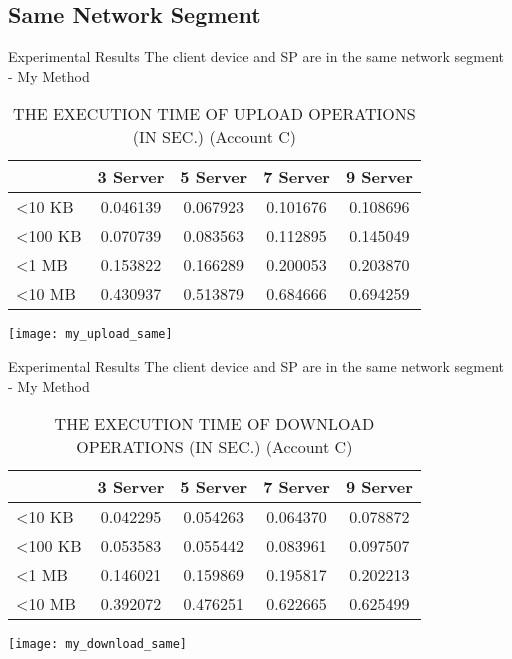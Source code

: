 \subsection{Same Network Segment}
\begin{frame}{Experimental Results}
{The client device and SP are in the same network segment - My Method}
	\scriptsize
    \begin{table}[]
    \centering
    \caption{THE EXECUTION TIME OF \alert{UPLOAD} OPERATIONS (IN SEC.) (Account C)}
    \begin{tabular}{lcccc}
                         & 3 Server & 5 Server & 7 Server & 9 Server \\ \hline
        \textless 10 KB  & 0.046139 & 0.067923 & 0.101676 & 0.108696 \\ \hline
        \textless 100 KB & 0.070739 & 0.083563 & 0.112895 & 0.145049 \\ \hline
        \textless 1 MB   & 0.153822 & 0.166289 & 0.200053 & 0.203870 \\ \hline
        \textless 10 MB  & 0.430937 & 0.513879 & 0.684666 & 0.694259 \\ \hline
    \end{tabular}
    \end{table}
    \begin{center}
		\texttt{[image: my\_upload\_same]}
    \end{center}
\end{frame}

\begin{frame}{Experimental Results}
{The client device and SP are in the same network segment - My Method}
	\scriptsize
    \begin{table}[]
    \centering
    \caption{THE EXECUTION TIME OF \alert{DOWNLOAD} OPERATIONS (IN SEC.) (Account C)}
    \begin{tabular}{lcccc}
                         & 3 Server & 5 Server & 7 Server & 9 Server \\ \hline
        \textless 10 KB  & 0.042295 & 0.054263 & 0.064370 & 0.078872 \\ \hline
        \textless 100 KB & 0.053583 & 0.055442 & 0.083961 & 0.097507 \\ \hline
        \textless 1 MB   & 0.146021 & 0.159869 & 0.195817 & 0.202213 \\ \hline
        \textless 10 MB  & 0.392072 & 0.476251 & 0.622665 & 0.625499 \\ \hline
    \end{tabular}
    \end{table}
    \begin{center}
		\texttt{[image: my\_download\_same]}
    \end{center}
\end{frame}

